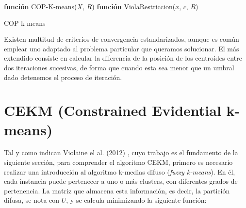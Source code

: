 \begin{algorithm}
	
	\BlankLine
	\BlankLine
	\textbf{función} COP-K-means($X$, $R$) 
	\BlankLine
	\BlankLine
	\textbf{función} ViolaRestriccion($x$, $c$, $R$) 
	
	\caption{COP-k-means}\label{alg:ckm}
\end{algorithm}

Existen multitud de criterios de convergencia estandarizados, aunque es común emplear uno adaptado al problema particular que queramos solucionar. El más extendido consiste en calcular la diferencia de la posición de los centroides entre dos iteraciones sucesivas, de forma que cuando esta sea menor que un umbral dado detenemos el proceso de iteración.

\clearpage

\section{CEKM (Constrained Evidential k-means)}

Tal y como indican Violaine el al. (2012) \cite{CECM:2012}, cuyo trabajo es el fundamento de la siguiente sección, para comprender el algoritmo  \acf{CEKM}, primero es necesario realizar una introducción al algoritmo k-medias difuso (\textit{fuzzy k-means}). En él, cada instancia puede pertenecer a uno o más clusters, con diferentes grados de pertenencia. La matriz que almacena esta información, es decir, la partición difusa, se nota con $U$, y se calcula minimizando la siguiente función:

